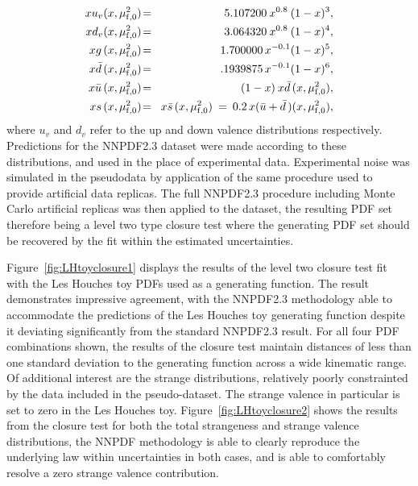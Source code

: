 \begin{eqnarray}
\label{gsav-eq9}
  xu_v(x,\mu_{\rm f,0}^2)       &\! =\! & 5.107200\: x^{0.8}\: (1-x)^3,  
    \nonumber \\
  xd_v(x,\mu_{\rm f,0}^2)       &\! =\! & 3.064320\: x^{0.8}\: (1-x)^4,  
    \nonumber \\
  xg\,(x,\mu_{\rm f,0}^2)       &\! =\! & 1.700000\, x^{-0.1} (1-x)^5, 
    \nonumber \\
  x\bar{d}\,(x,\mu_{\rm f,0}^2) &\! =\! & .1939875\, x^{-0.1} (1-x)^6,
    \nonumber\\
  x\bar{u}\,(x,\mu_{\rm f,0}^2) &\! =\! & (1-x)\: x\bar{d}\,(x,\mu_{\rm f,0}^2),
    \nonumber\\
  xs\,(x,\mu_{\rm f,0}^2)       &\! =\! & x\bar{s}\,(x,\mu_{\rm f,0}^2) 
    \: = \: 0.2\, x(\bar{u}+\bar{d}\,)(x,\mu_{\rm f,0}^2),
\end{eqnarray}
where $u_v$ and $d_v$ refer to the up and down valence distributions respectively. Predictions for the NNPDF2.3 dataset were made according to these distributions, and used in the place of experimental data. Experimental noise was simulated in the pseudodata by application of the same procedure used to provide artificial data replicas. The full NNPDF2.3 procedure including Monte Carlo artificial replicas was then applied to the dataset, the resulting PDF set therefore being a level two type closure test where the generating PDF set should be recovered by the fit within the estimated uncertainties.

Figure~\ref{fig:LHtoyclosure1} displays the results of the level two closure test fit with the Les Houches toy PDFs used as a generating function. The result demonstrates impressive agreement, with the NNPDF2.3 methodology able to accommodate the predictions of the Les Houches toy generating function despite it deviating significantly from the standard NNPDF2.3 result. For all four PDF combinations shown, the results of the closure test maintain distances of less than one standard deviation to the generating function across a wide kinematic range. Of additional interest are the strange distributions, relatively poorly constrainted by the data included in the pseudo-dataset. The strange valence in particular is set to zero in the Les Houches toy. Figure~\ref{fig:LHtoyclosure2} shows the results from the closure test for both the total strangeness and strange valence distributions, the NNPDF methodology is able to clearly reproduce the underlying law within uncertainties in both cases, and is able to comfortably resolve a zero strange valence contribution.

